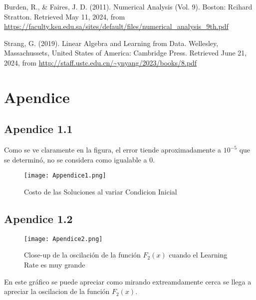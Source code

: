 \documentclass{article}
\begin{document}
\noindent Burden, R., \& Faires, J. D. (2011). Numerical Analysis (Vol. 9). Boston: Rcihard Stratton. Retrieved May 11, 2024, from \url{https://faculty.ksu.edu.sa/sites/default/files/numerical_analysis_9th.pdf}
\vspace{\baselineskip}

\noindent Strang, G. (2019). Linear Algebra and Learning from Data. Wellesley, Massachussets, United States of America: Cambridge Press. Retrieved June 21, 2024, from \url{http://staff.ustc.edu.cn/~ynyang/2023/books/8.pdf}


\section*{Apendice}

\subsection*{Apendice 1.1}

\noindent Como se ve claramente en la figura, el error tiende aproximadamente a $10^{-5}$ que se determinó, no se considera como igualable a $0$.

\begin{figure}[ht]
    \centering
    \caption{Costo de las Soluciones al variar Condicion Inicial}
    \texttt{[image: Appendice1.png]}
    \label{fig:Image 1}
\end{figure}
\vspace{15\baselineskip}

\subsection*{Apendice 1.2}

\begin{figure}[ht]
    \centering
    \caption{Close-up de la oscilación de la función $F_2(x)$ cuando el Learning Rate es muy grande}
    \texttt{[image: Apendice2.png]}
    \label{fig:Image 1}
\end{figure}

\noindent En este gráfico se puede apreciar como mirando extreamdamente cerca se llega a apreciar la oscilacion de la función $F_2(x)$.
\end{document}
